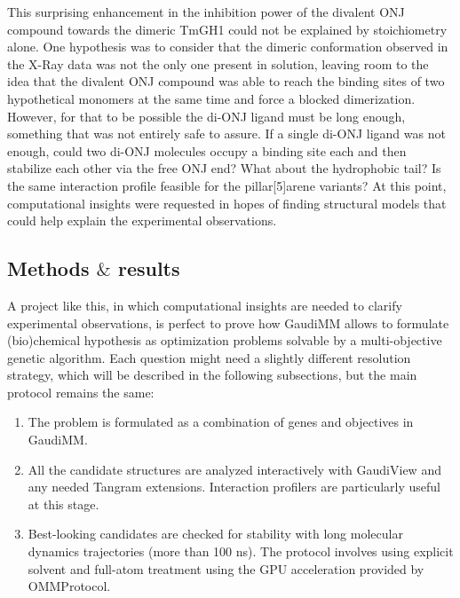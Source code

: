 This surprising enhancement in the inhibition power of the divalent ONJ compound towards the dimeric TmGH1 could not be explained by stoichiometry alone. One hypothesis was to consider that the dimeric conformation observed in the X-Ray data was not the only one present in solution, leaving room to the idea that the divalent ONJ compound was able to reach the binding sites of two hypothetical monomers at the same time and force a blocked dimerization. However, for that to be possible the di-ONJ ligand must be long enough, something that was not entirely safe to assure. If a single di-ONJ ligand was not enough, could two di-ONJ molecules occupy a binding site each and then stabilize each other via the free ONJ end? What about the hydrophobic tail? Is the same interaction profile feasible for the pillar[5]arene variants? At this point, computational insights were requested in hopes of finding structural models that could help explain the experimental observations.

\subsection{Methods $\&$  results}
A project like this, in which computational insights are needed to clarify experimental observations, is perfect to prove how GaudiMM allows to formulate (bio)chemical hypothesis as optimization problems solvable by a multi-objective genetic algorithm. Each question might need a slightly different resolution strategy, which will be described in the following subsections, but the main protocol remains the same:

\begin{enumerate}
	\item The problem is formulated as a combination of genes and objectives in GaudiMM.

	\item All the candidate structures are analyzed interactively with GaudiView and any needed Tangram extensions. Interaction profilers are particularly useful at this stage.

	\item Best-looking candidates are checked for stability with long molecular dynamics trajectories (more than 100 ns). The protocol involves using explicit solvent and full-atom treatment using the GPU acceleration provided by OMMProtocol.
\end{enumerate}

